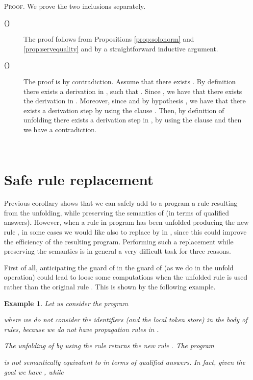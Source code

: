 \documentclass[final]{acmtrans2e}
\newtheorem{exa}[theorem]{Example}
\newenvironment{example}{\begin{exa}}{\end{exa}}
\begin{document}
\textsc{Proof.}
We prove the two inclusions separately.
\begin{description}
  \item[{\bf ()}] The proof follows from Propositions \ref{prop:solonorm} and \ref{prop:servequality} and by a straightforward inductive argument.
  \item[{\bf ()}]
  The proof is by contradiction. Assume that there exists . By definition there exists a derivation
   in , such that . Since , we have that there exists the derivation
 in . Moreover, since  and by hypothesis , we have that there exists a derivation step  by using the clause .
Then, by definition of unfolding there exists a derivation step  in , by using the clause  and then we have a contradiction.
\end{description}

\noindent{}\\
	

\section{Safe rule replacement}\label{sec:safty-rule-deletion}
Previous corollary shows that we can safely add to a program 
a rule resulting from the unfolding, while preserving the
semantics of   (in terms of qualified answers).
However, when a rule  in program  has been unfolded producing
the new rule , in some cases we would like also to replace  by  in ,
since this could improve the efficiency of the resulting program.
Performing such a replacement while preserving the semantics
is in general a very difficult task for three reasons.

First of all, anticipating the guard of  in the guard of 
(as we do in the unfold operation) could lead to loose some
computations  when the unfolded rule   is used rather than the
original rule . This is shown by the following example.




\begin{example}\label{esempio:mau}
Let us consider the program

where we do not consider the identifiers (and the local token store) in
the body of rules, because we do not have propagation rules in
.

The unfolding  of  by using the rule  returns the new
rule . The
program

is not semantically equivalent to  in terms of qualified
answers. In fact, given the goal  we have , while 
\end{example}
\end{document}
